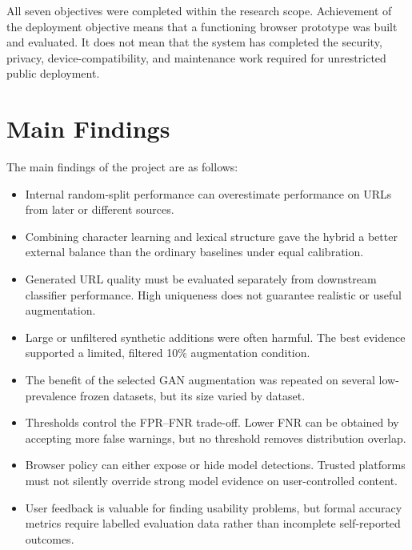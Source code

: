 All seven objectives were completed within the research scope. Achievement of
the deployment objective means that a functioning browser prototype was built
and evaluated. It does not mean that the system has completed the security,
privacy, device-compatibility, and maintenance work required for unrestricted
public deployment.

\section{Main Findings}

The main findings of the project are as follows:

\begin{itemize}
\item Internal random-split performance can overestimate performance on URLs
from later or different sources.

\item Combining character learning and lexical structure gave the hybrid a
better external balance than the ordinary baselines under equal calibration.

\item Generated URL quality must be evaluated separately from downstream
classifier performance. High uniqueness does not guarantee realistic or useful
augmentation.

\item Large or unfiltered synthetic additions were often harmful. The best
evidence supported a limited, filtered 10\% augmentation condition.

\item The benefit of the selected GAN augmentation was repeated on several
low-prevalence frozen datasets, but its size varied by dataset.

\item Thresholds control the FPR--FNR trade-off. Lower FNR can be obtained by
accepting more false warnings, but no threshold removes distribution overlap.

\item Browser policy can either expose or hide model detections. Trusted
platforms must not silently override strong model evidence on user-controlled
content.

\item User feedback is valuable for finding usability problems, but formal
accuracy metrics require labelled evaluation data rather than incomplete
self-reported outcomes.
\end{itemize}

